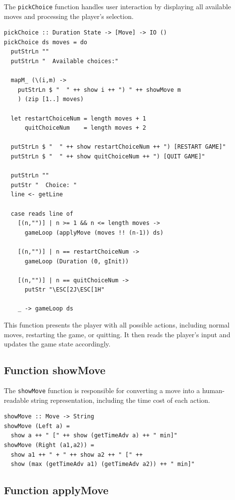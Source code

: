 \documentclass[a4paper,12pt]{report}
\begin{document}
The \texttt{pickChoice} function handles user interaction by displaying all available moves and processing the player's selection.

\begin{verbatim}
pickChoice :: Duration State -> [Move] -> IO ()
pickChoice ds moves = do
  putStrLn ""
  putStrLn "  Available choices:"

  mapM_ (\(i,m) ->
    putStrLn $ "  " ++ show i ++ ") " ++ showMove m
    ) (zip [1..] moves)

  let restartChoiceNum = length moves + 1
      quitChoiceNum    = length moves + 2

  putStrLn $ "  " ++ show restartChoiceNum ++ ") [RESTART GAME]"
  putStrLn $ "  " ++ show quitChoiceNum ++ ") [QUIT GAME]"

  putStrLn ""
  putStr "  Choice: "
  line <- getLine

  case reads line of
    [(n,"")] | n >= 1 && n <= length moves ->
      gameLoop (applyMove (moves !! (n-1)) ds)

    [(n,"")] | n == restartChoiceNum ->
      gameLoop (Duration (0, gInit))

    [(n,"")] | n == quitChoiceNum ->
      putStr "\ESC[2J\ESC[1H"

    _ -> gameLoop ds
\end{verbatim}

This function presents the player with all possible actions, including normal moves, restarting the game, or quitting. It then reads the player's input and updates the game state accordingly.

\subsection{Function showMove}

The \texttt{showMove} function is responsible for converting a move into a human-readable string representation, including the time cost of each action.

\begin{verbatim}
showMove :: Move -> String
showMove (Left a) =
  show a ++ " [" ++ show (getTimeAdv a) ++ " min]"
showMove (Right (a1,a2)) =
  show a1 ++ " + " ++ show a2 ++ " [" ++
  show (max (getTimeAdv a1) (getTimeAdv a2)) ++ " min]"
\end{verbatim}

\subsection{Function applyMove}
\end{document}

